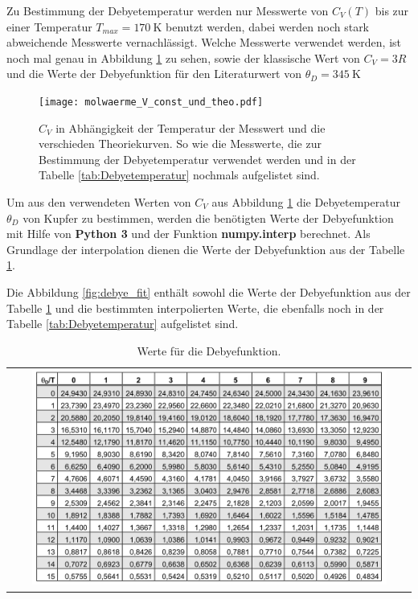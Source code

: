 Zu Bestimmung der Debyetemperatur werden nur Messwerte von $C_V(T)$ bis zur einer Temperatur $T_{max}=\SI{170}{\kelvin} $ benutzt werden, dabei werden noch stark abweichende Messwerte vernachlässigt.
Welche Messwerte verwendet werden, ist noch mal genau in Abbildung \ref{fig:cool} zu sehen, sowie
der klassische Wert von $C_V=3R$ und die Werte der Debyefunktion
für den Literaturwert von $\theta_D = \SI{345}{\kelvin}$  \cite{debyetemp}


\begin{figure}
 \centering
 \texttt{[image: molwaerme\_V\_const\_und\_theo.pdf]}
   \caption{ $C_V$ in Abhängigkeit der Temperatur
    der Messwert und die verschieden
    Theoriekurven. So wie die Messwerte,
   die zur Bestimmung der Debyetemperatur
    verwendet werden und in der
    Tabelle \ref{tab:Debyetemperatur}
    nochmals aufgelistet sind.}
   \label{fig:cool}
 \end{figure}

 Um aus den verwendeten Werten von $C_V$ aus
Abbildung \ref{fig:cool} die Debyetemperatur
 $\theta_D$ von Kupfer zu bestimmen,
werden die benötigten Werte der Debyefunktion
mit Hilfe von \textbf{Python 3} und der
Funktion \textbf{numpy.interp} \cite{interp}
berechnet. Als Grundlage der interpolation
dienen die Werte der Debyefunktion aus der
Tabelle \ref{fig:debye}.

Die Abbildung \ref{fig:debye_fit} enthält sowohl
die Werte der Debyefunktion
aus der Tabelle \ref{fig:debye} und die bestimmten
interpolierten Werte, die ebenfalls noch in der Tabelle
\ref{tab:Debyetemperatur} aufgelistet sind.

 \begin{table}
  \centering
  \caption{Werte für die Debyefunktion.}
  \label{fig:debye}
\begin{tabular}{c}
  \includegraphics[width=0.9\textwidth]{Debye.PNG}
\end{tabular}
\end{table}

